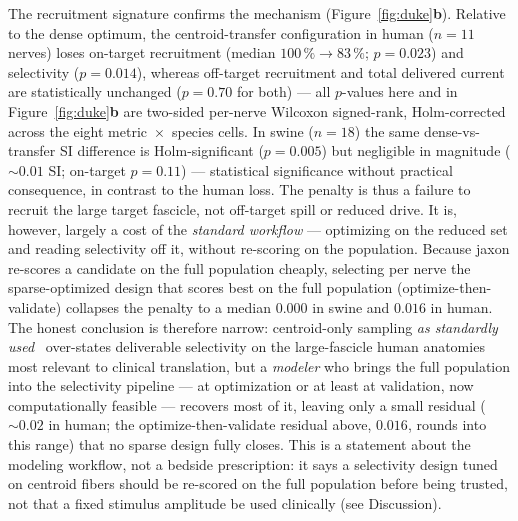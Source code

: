 The recruitment signature confirms the mechanism
(Figure~\ref{fig:duke}\textbf{b}).  Relative to the dense optimum, the
centroid-transfer configuration in human ($n = 11$ nerves) loses
on-target recruitment (median $100\,\% \rightarrow 83\,\%$;
$p = 0.023$) and selectivity ($p = 0.014$), whereas off-target
recruitment and total delivered current are statistically unchanged
($p = 0.70$ for both) --- all $p$-values here and in
Figure~\ref{fig:duke}\textbf{b} are two-sided per-nerve Wilcoxon
signed-rank, Holm-corrected across the eight metric~$\times$~species
cells.  In swine ($n = 18$) the same dense-vs-transfer SI difference is
Holm-significant ($p = 0.005$) but negligible in magnitude
(${\sim}0.01$ SI; on-target $p = 0.11$) --- statistical significance
without practical consequence, in contrast to the human loss.  The penalty is thus a
failure to recruit the large target fascicle, not off-target spill or
reduced drive.  It is, however, largely a cost of the \emph{standard
workflow} --- optimizing on the reduced set and reading selectivity off
it, without re-scoring on the population.  Because jaxon re-scores a
candidate on the full population cheaply, selecting per nerve the
sparse-optimized design that scores best on the full population
(optimize-then-validate) collapses the penalty to a median $0.000$ in
swine and $0.016$ in human.  The honest conclusion is therefore narrow:
centroid-only sampling \emph{as standardly used}~\cite{hussain2024axonml}
over-states deliverable selectivity on the large-fascicle human anatomies
most relevant to clinical translation, but a \emph{modeler} who brings
the full population into the selectivity pipeline --- at optimization or
at least at validation, now computationally feasible --- recovers most
of it, leaving only a small residual (${\sim}0.02$ in human; the
optimize-then-validate residual above, $0.016$, rounds into this range)
that no sparse design fully closes.  This is a statement about the
modeling workflow, not a bedside prescription: it says a selectivity
design tuned on centroid fibers should be re-scored on the full
population before being trusted, not that a fixed stimulus amplitude be
used clinically (see Discussion).
